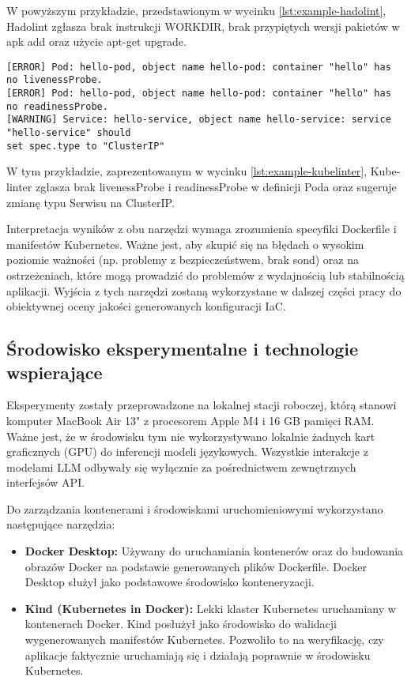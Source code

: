 W powyższym przykładzie, przedstawionym w wycinku \ref{lst:example-hadolint}, Hadolint zgłasza brak instrukcji WORKDIR, brak przypiętych wersji pakietów w apk add oraz użycie apt-get upgrade.

\begin{lstlisting}[caption={Przykład wyników Kube-linter},label={lst:example-kubelinter},captionpos=b,columns=fullflexible, breaklines=true]
[ERROR] Pod: hello-pod, object name hello-pod: container "hello" has no livenessProbe.
[ERROR] Pod: hello-pod, object name hello-pod: container "hello" has no readinessProbe.
[WARNING] Service: hello-service, object name hello-service: service "hello-service" should
set spec.type to "ClusterIP"
\end{lstlisting}

W tym przykładzie, zaprezentowanym w wycinku \ref{lst:example-kubelinter}, Kube-linter zgłasza brak livenessProbe i readinessProbe w definicji Poda oraz sugeruje zmianę typu Serwisu na ClusterIP.

Interpretacja wyników z obu narzędzi wymaga zrozumienia specyfiki Dockerfile i manifestów Kubernetes. Ważne jest, aby skupić się na błędach o wysokim poziomie ważności (np. problemy z bezpieczeństwem, brak sond) oraz na ostrzeżeniach, które mogą prowadzić do problemów z wydajnością lub stabilnością aplikacji. Wyjścia z tych narzędzi zostaną wykorzystane w dalszej części pracy do obiektywnej oceny jakości generowanych konfiguracji IaC.

\subsection{Środowisko eksperymentalne i technologie wspierające}

Eksperymenty zostały przeprowadzone na lokalnej stacji roboczej, którą stanowi komputer MacBook Air 13" z procesorem Apple M4 i 16 GB pamięci RAM. Ważne jest, że w środowisku tym nie wykorzystywano lokalnie żadnych kart graficznych (GPU) do inferencji modeli językowych. Wszystkie interakcje z modelami LLM odbywały się wyłącznie za pośrednictwem zewnętrznych interfejsów API.

Do zarządzania kontenerami i środowiskami uruchomieniowymi wykorzystano następujące narzędzia:
\begin{itemize}
	\item \textbf{Docker Desktop:} \cite{docker_desktop} Używany do uruchamiania kontenerów oraz do budowania obrazów Docker na podstawie generowanych plików Dockerfile. Docker Desktop służył jako podstawowe środowisko konteneryzacji.
	\item \textbf{Kind (Kubernetes in Docker):} \cite{kind} Lekki klaster Kubernetes uruchamiany w kontenerach Docker. Kind posłużył jako środowisko do walidacji wygenerowanych manifestów Kubernetes. Pozwoliło to na weryfikację, czy aplikacje faktycznie uruchamiają się i działają poprawnie w środowisku Kubernetes.
\end{itemize}

